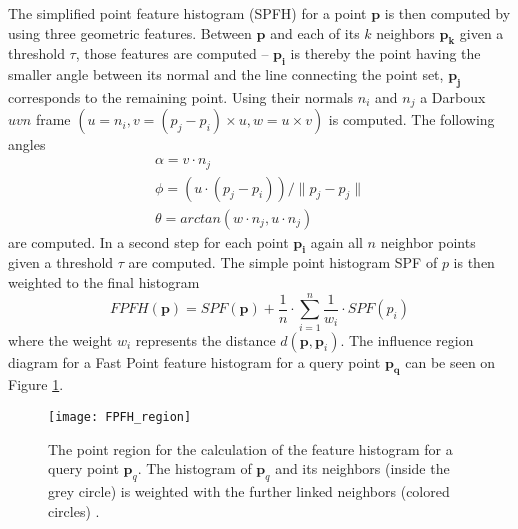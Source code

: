 The simplified point feature histogram (SPFH) for a point $\boldsymbol{p}$ is then computed by using three geometric features. Between $\boldsymbol{p}$ and each of its $k$ neighbors $\boldsymbol{p_k}$ given a threshold $\tau$, those features are computed -- $\boldsymbol{p_i}$ is thereby the point having the smaller angle between its normal and the line connecting the point set, $\boldsymbol{p_j}$ corresponds to the remaining point. Using their normals $n_i$ and $n_j$ a Darboux $uvn$ frame $(u = n_i, v = (p_j - p_i) \times u, w = u \times v)$ is computed. The following angles
\begin{equation}
\begin{split}
\alpha = v \cdot n_j
\\
\phi = (u \cdot (p_j - p_i))/\|p_j - p_j\|
\\
\theta = arctan(w \cdot n_j, u \cdot n_j)
\end{split}
\label{eq:AngularVariations}
\end{equation}
are computed. In a second step for each point $\boldsymbol{p_i}$ again all $n$ neighbor points given a threshold $\tau$ are computed. The simple point histogram SPF of $p$ is then weighted to the final histogram
\begin{equation}
FPFH(\boldsymbol{p}) = SPF(\boldsymbol{p}) + \frac{1}{n} \cdot \displaystyle\sum_{i=1}^{n}\frac{1}{w_i} \cdot SPF(p_i)
\end{equation}
where the weight $w_i$ represents the distance $d(\boldsymbol{p},\boldsymbol{p}_i)$. The influence region diagram for a Fast Point feature histogram for a query point $\boldsymbol{p_q}$ can be seen on Figure \ref{fig:FPFHregion}. 
\begin{figure}[H]
	\centering
	\texttt{[image: FPFH\_region]}
	\caption{The point region for the calculation of the feature histogram for a query point $\boldsymbol{p}_q$. The histogram of $\boldsymbol{p}_q$ and its neighbors (inside the grey circle) is weighted with the further linked neighbors (colored circles) \cite{FPFH}.}
	\label{fig:FPFHregion}
\end{figure}
